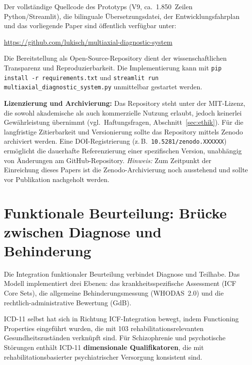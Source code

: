 \documentclass[11pt,a4paper]{article}
\begin{document}
Der vollst\"andige Quellcode des Prototyps (V9, ca.\ 1.850~Zeilen Python/Streamlit), die bilinguale \"Ubersetzungsdatei, der Entwicklungsfahrplan und das vorliegende Paper sind \"offentlich verf\"ugbar unter:

\begin{center}
\url{https://github.com/lukisch/multiaxial-diagnostic-system}
\end{center}

\noindent Die Bereitstellung als Open-Source-Repository dient der wissenschaftlichen Transparenz und Reproduzierbarkeit. Die Implementierung kann mit \texttt{pip install -r requirements.txt} und \texttt{streamlit run multiaxial\_diagnostic\_system.py} unmittelbar gestartet werden.

\textbf{Lizenzierung und Archivierung:} Das Repository steht unter der MIT-Lizenz, die sowohl akademische als auch kommerzielle Nutzung erlaubt, jedoch keinerlei Gew\"ahrleistung \"ubernimmt (vgl.\ Haftungsfragen, Abschnitt~\ref{sec:ethik}). F\"ur die langfristige Zitierbarkeit und Versionierung sollte das Repository mittels Zenodo archiviert werden. Eine DOI-Registrierung (z.\,B.\ \texttt{10.5281/zenodo.XXXXXX}) erm\"oglicht die dauerhafte Referenzierung einer spezifischen Version, unabh\"angig von \"Anderungen am GitHub-Repository. \textit{Hinweis:} Zum Zeitpunkt der Einreichung dieses Papers ist die Zenodo-Archivierung noch ausstehend und sollte vor Publikation nachgeholt werden.


\section{Funktionale Beurteilung: Br\"ucke zwischen Diagnose und Behinderung}
\label{sec:funktional}

Die Integration funktionaler Beurteilung verbindet Diagnose und Teilhabe. Das Modell implementiert drei Ebenen: das krankheitsspezifische Assessment (ICF Core Sets), die allgemeine Behinderungsmessung (WHODAS~2.0) und die rechtlich-administrative Bewertung (GdB).

ICD-11 selbst hat sich in Richtung ICF-Integration bewegt, indem \glqq Functioning Properties\grqq{} eingef\"uhrt wurden, die mit 103 rehabilitationsrelevanten Gesundheitszust\"anden verkn\"upft sind. F\"ur Schizophrenie und psychotische St\"orungen enth\"alt ICD-11 \textbf{dimensionale Qualifikatoren}, die mit rehabilitationsbasierter psychiatrischer Versorgung konsistent sind.
\end{document}
